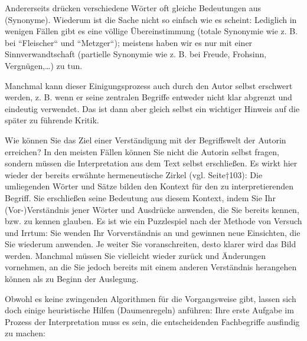 \documentclass[]{book}
\theoremstyle{definition}
\theoremstyle{definition}
\theoremstyle{definition}
\theoremstyle{remark}
\begin{document}
Andererseits drücken verschiedene Wörter oft gleiche Bedeutungen aus
(Synonyme). Wiederum ist die Sache nicht so einfach wie es scheint:
Lediglich in wenigen Fällen gibt es eine völlige Übereinstimmung (totale
Synonymie wie z. B. bei ``Fleischer`` und ``Metzger``); meistens haben
wir es nur mit einer Sinnverwandtschaft (partielle Synonymie wie z. B.
bei Freude, Frohsinn, Vergnügen,\ldots{}) zu tun.

Manchmal kann dieser Einigungsprozess auch durch den Autor selbst
erschwert werden, z. B. wenn er seine zentralen Begriffe entweder nicht
klar abgrenzt und eindeutig verwendet. Das ist dann aber gleich selbst
ein wichtiger Hinweis auf die später zu führende Kritik.

Wie können Sie das Ziel einer Verständigung mit der Begriffswelt der
Autorin erreichen? In den meisten Fällen können Sie nicht die Autorin
selbst fragen, sondern müssen die Interpretation aus dem Text selbst
erschließen. Es wirkt hier wieder der bereits erwähnte hermeneutische
Zirkel (vgl. Seite†103): Die umliegenden Wörter und Sätze bilden den
Kontext für den zu interpretierenden Begriff. Sie erschließen seine
Bedeutung aus diesem Kontext, indem Sie Ihr (Vor-)Verständnis jener
Wörter und Ausdrücke anwenden, die Sie bereits kennen, bzw. zu kennen
glauben. Es ist wie ein Puzzlespiel nach der Methode von Versuch und
Irrtum: Sie wenden Ihr Vorverständnis an und gewinnen neue Einsichten,
die Sie wiederum anwenden. Je weiter Sie voranschreiten, desto klarer
wird das Bild werden. Manchmal müssen Sie vielleicht wieder zurück und
Änderungen vornehmen, an die Sie jedoch bereits mit einem anderen
Verständnis herangehen können als zu Beginn der Auslegung.

Obwohl es keine zwingenden Algorithmen für die Vorgangsweise gibt,
lassen sich doch einige heuristische Hilfen (Daumenregeln) anführen:
Ihre erste Aufgabe im Prozess der Interpretation muss es sein, die
entscheidenden Fachbegriffe ausfindig zu machen:
\end{document}
